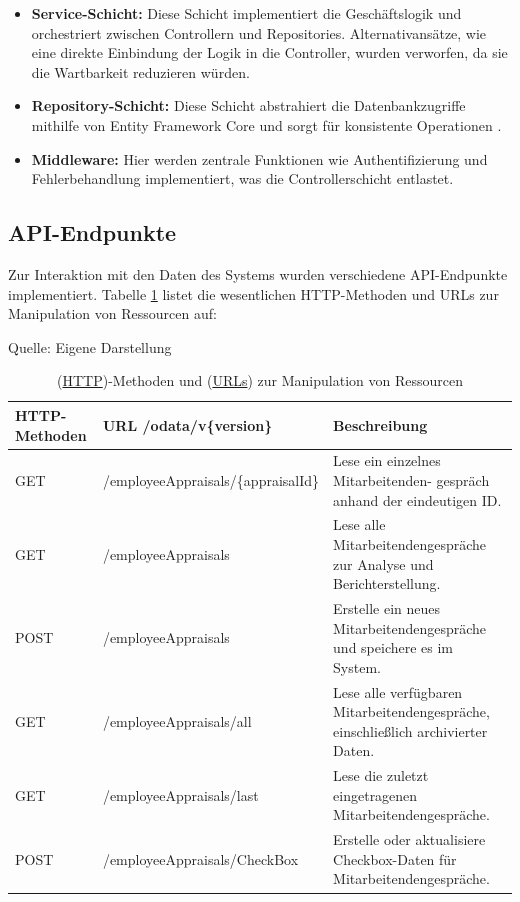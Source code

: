 \begin{itemize}
    \item \textbf{Service-Schicht:} Diese Schicht implementiert die Geschäftslogik und orchestriert zwischen Controllern und Repositories. Alternativansätze, wie eine direkte Einbindung der Logik in die Controller, wurden verworfen, da sie die Wartbarkeit reduzieren würden.
    \item \textbf{Repository-Schicht:} Diese Schicht abstrahiert die Datenbankzugriffe mithilfe von Entity Framework Core und sorgt für konsistente Operationen \cite{efCoreDocs2023}.
    \item \textbf{Middleware:} Hier werden zentrale Funktionen wie Authentifizierung und Fehlerbehandlung implementiert, was die Controllerschicht entlastet.
\end{itemize}

\subsection{API-Endpunkte}
Zur Interaktion mit den Daten des Systems wurden verschiedene API-Endpunkte implementiert. Tabelle \ref{table:http-methods} listet die wesentlichen HTTP-Methoden und URLs zur Manipulation von Ressourcen auf:

\begin{table}[H]
\caption{(\hyperref[abkuerzungen]{HTTP})-Methoden und (\hyperref[abkuerzungen]{URLs}) zur Manipulation von Ressourcen}
\label{table:http-methods}
\raggedright
{\scriptsize Quelle: Eigene Darstellung} \\[0.3em]
\renewcommand{\arraystretch}{1.1}
\setlength{\tabcolsep}{1.8pt}
\begin{tabularx}{\textwidth}{>{\centering\arraybackslash}m{2cm}|>{\centering\arraybackslash}m{5.5cm}|>{\raggedright\arraybackslash}m{6.5cm}}
\hline
\textbf{HTTP-Methoden} & \textbf{URL /odata/v\{version\}} & \textbf{Beschreibung} \\\hline
GET & /employeeAppraisals/\{appraisalId\} & Lese ein einzelnes Mitarbeitenden- \linebreak gespräch anhand der eindeutigen ID. \\\hline
GET & /employeeAppraisals & Lese alle Mitarbeitendengespräche zur Analyse und Berichterstellung. \\\hline
POST & /employeeAppraisals & Erstelle ein neues Mitarbeitendengespräche und speichere es im System. \\\hline
GET & /employeeAppraisals/all & Lese alle verfügbaren Mitarbeitendengespräche, einschließlich archivierter Daten. \\\hline
GET & /employeeAppraisals/last & Lese die zuletzt eingetragenen Mitarbeitendengespräche. \\\hline
POST & /employeeAppraisals/CheckBox & Erstelle oder aktualisiere Checkbox-Daten für Mitarbeitendengespräche. \\\hline
\end{tabularx}
\end{table}


